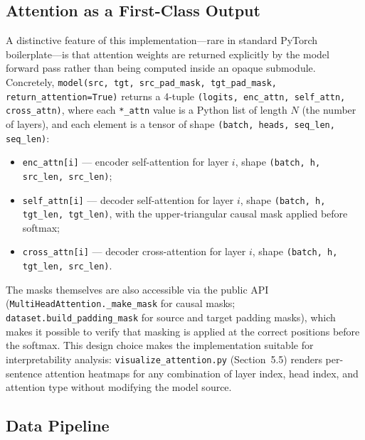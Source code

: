 \documentclass[10pt]{article}
\begin{document}
\subsection{Attention as a First-Class Output}

A distinctive feature of this implementation---rare in standard PyTorch boilerplate---is that attention weights are returned explicitly by the model forward pass rather than being computed inside an opaque submodule. Concretely, \texttt{model(src, tgt, src\_pad\_mask, tgt\_pad\_mask, return\_attention=True)} returns a 4-tuple \texttt{(logits, enc\_attn, self\_attn, cross\_attn)}, where each \texttt{*\_attn} value is a Python list of length $N$ (the number of layers), and each element is a tensor of shape \texttt{(batch, heads, seq\_len, seq\_len)}:
\begin{itemize}
\item \texttt{enc\_attn[i]} --- encoder self-attention for layer $i$, shape \texttt{(batch, h, src\_len, src\_len)};
\item \texttt{self\_attn[i]} --- decoder self-attention for layer $i$, shape \texttt{(batch, h, tgt\_len, tgt\_len)}, with the upper-triangular causal mask applied before softmax;
\item \texttt{cross\_attn[i]} --- decoder cross-attention for layer $i$, shape \texttt{(batch, h, tgt\_len, src\_len)}.
\end{itemize}
The masks themselves are also accessible via the public API (\texttt{MultiHeadAttention.\_make\_mask} for causal masks; \texttt{dataset.build\_padding\_mask} for source and target padding masks), which makes it possible to verify that masking is applied at the correct positions before the softmax. This design choice makes the implementation suitable for interpretability analysis: \texttt{visualize\_attention.py} (Section~5.5) renders per-sentence attention heatmaps for any combination of layer index, head index, and attention type without modifying the model source.

\subsection{Data Pipeline}
\end{document}
